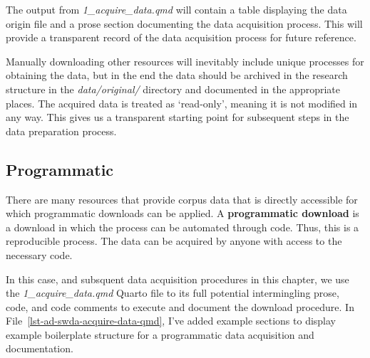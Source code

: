 \documentclass[
  letterpaper,
  DIV=11,
  numbers=noendperiod]{scrreport}
\theoremstyle{definition}
\theoremstyle{remark}
\begin{document}
The output from \emph{1\_acquire\_data.qmd} will contain a table
displaying the data origin file and a prose section documenting the data
acquisition process. This will provide a transparent record of the data
acquisition process for future reference.

Manually downloading other resources will inevitably include unique
processes for obtaining the data, but in the end the data should be
archived in the research structure in the \emph{data/original/}
directory and documented in the appropriate places. The acquired data is
treated as `read-only', meaning it is not modified in any way. This
gives us a transparent starting point for subsequent steps in the data
preparation process.

\hypertarget{programmatic}{%
\subsection{Programmatic}\label{programmatic}}

There are many resources that provide corpus data that is directly
accessible for which programmatic downloads can be applied. A
\textbf{programmatic download} is a download in which the process can be
automated through code. Thus, this is a reproducible process. The data
can be acquired by anyone with access to the necessary code.

In this case, and subsquent data acquisition procedures in this chapter,
we use the \emph{1\_acquire\_data.qmd} Quarto file to its full potential
intermingling prose, code, and code comments to execute and document the
download procedure. In File~\ref{lst-ad-swda-acquire-data-qmd}, I've
added example sections to display example boilerplate structure for a
programmatic data acquisition and documentation.
\end{document}
